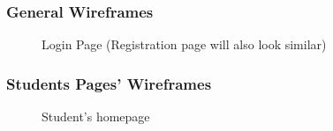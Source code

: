 \subsubsection{General Wireframes}
\begin{figure}[H]
    \centering
    \caption{Login Page (Registration page will also look similar)}
    \label{fig:login}
\end{figure}

\subsubsection{Students Pages' Wireframes}
\begin{figure}[H]
    \centering
    \caption{Student's homepage}
    \label{fig:stu_home}
\end{figure}

